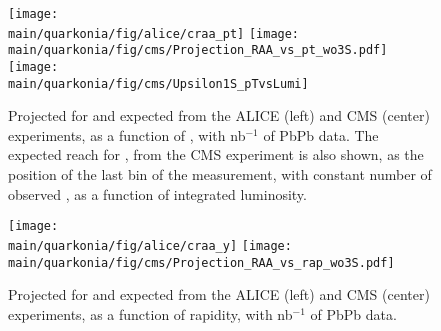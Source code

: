\documentclass[../report.tex]{subfiles}
\providecommand{\main}{..}
\begin{document}
\begin{figure}
\begin{center}
 \texttt{[image: \\main/quarkonia/fig/alice/craa\_pt]}
 \texttt{[image: \\main/quarkonia/fig/cms/Projection\_RAA\_vs\_pt\_wo3S.pdf]}
 \texttt{[image: \\main/quarkonia/fig/cms/Upsilon1S\_pTvsLumi]}
\end{center}

 \caption{Projected \raa for  and  expected from the ALICE (left) and CMS (center) experiments, as a function of \pt, with \unit[10]{nb}$^{-1}$ of PbPb data. The expected \pt reach for , from the CMS experiment is
 also shown, as the position of the last \pt bin of the measurement, with constant number of observed , as a function of integrated luminosity.
 }
 \label{fig:upsi_raa_pt}
\end{figure}

\begin{figure}
\begin{center}
 \texttt{[image: \\main/quarkonia/fig/alice/craa\_y]}
 \texttt{[image: \\main/quarkonia/fig/cms/Projection\_RAA\_vs\_rap\_wo3S.pdf]}
\end{center}

 \caption{Projected \raa for  and  expected from the ALICE (left) and CMS (center) experiments, as a function of rapidity, with \unit[10]{nb}$^{-1}$ of PbPb data.
 }
 \label{fig:upsi_raa_y}
\end{figure}
\end{document}
